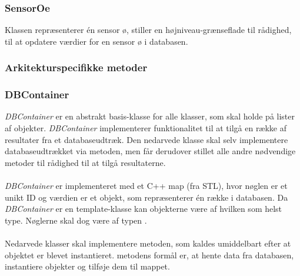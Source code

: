 \subsubsection{SensorOe}
Klassen repræsenterer én sensor ø, stiller en højniveau-grænseflade til rådighed, til at opdatere værdier for en sensor ø i databasen.

\subsubsection{Arkitekturspecifikke metoder}

{
}

{
}



\subsubsection{DBContainer}
\textit{DBContainer} er en abstrakt basis-klasse for alle klasser, som skal holde på lister af objekter. \textit{DBContainer} implementerer funktionalitet til at tilgå en række af resultater fra et databaseudtræk. Den nedarvede klasse skal selv implementere databaseudtrækket via  metoden, men får derudover stillet alle andre nødvendige metoder til rådighed til at tilgå resultaterne.\\\\

\textit{DBContainer} er implementeret med et C++ map (fra STL), hvor nøglen er et unikt ID og værdien er et objekt, som repræsenterer én række i databasen. Da \textit{DBContainer} er en template-klasse kan objekterne være af hvilken som helst type. Nøglerne skal dog være af typen .\\\\

Nedarvede klasser skal implementere  metoden, som kaldes umiddelbart efter at objektet er blevet instantieret.  metodens formål er, at hente data fra databasen, instantiere objekter og tilføje dem til mappet.


